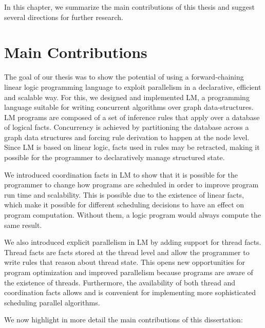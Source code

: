 
In this chapter, we summarize the main contributions of this thesis and suggest
several directions for further research.

\section{Main Contributions}

The goal of our thesis was to show the potential of using a forward-chaining
linear logic programming language to exploit parallelism in a declarative,
efficient and scalable way. For this, we designed and implemented LM, a
programming language suitable for writing concurrent algorithms over graph
data-structures. LM programs are composed of a set of inference rules that apply
over a database of logical facts. Concurrency is achieved by partitioning the
database across a graph data structures and forcing rule derivation to happen at
the node level. Since LM is based on linear logic, facts used in rules may be
retracted, making it possible for the programmer to declaratively manage
structured state.

We introduced coordination facts in LM to show that it is possible for the
programmer to change how programs are scheduled in order to improve program run
time and scalability. This is possible due to the existence of linear facts,
which make it possible for different scheduling decisions to have an effect on
program computation. Without them, a logic program would always compute the same
result.

We also introduced explicit parallelism in LM by adding support for thread
facts. Thread facts are facts stored at the thread level and allow the
programmer to write rules that reason about thread state. This opens new
opportunities for program optimization and improved parallelism because programs
are aware of the existence of threads. Furthermore, the availability of both
thread and coordination facts allows and is convenient for implementing more
sophisticated scheduling parallel algorithms.

We now highlight in more detail the main contributions of this dissertation:

